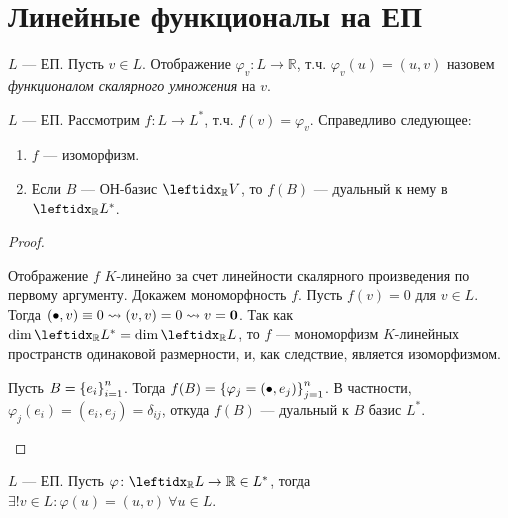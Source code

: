 \section{Линейные функционалы на ЕП}

\begin{defn}
    $L$ --- ЕП. Пусть $v \in L$. Отображение $\varphi_v \colon L \to \mathbb{R}$, т.ч. $\varphi_v(u) = (u, v)$ назовем \textit{функционалом скалярного умножения} на $v$.
\end{defn}

\begin{thm*}
    $L$ --- ЕП. Рассмотрим $f \colon L \to L^*$, т.ч. $f(v) = \varphi_v$. Справедливо следующее:
    \begin{enumerate}
        \item $f$ --- изоморфизм.
        \item Если $B$ --- ОН-базис $\lsub{\mathbb{R}}{V}$, то $f(B)$ --- дуальный к нему в $\lsub{\mathbb{R}}{L^*}$.
    \end{enumerate}
\end{thm*}

\begin{proof}
    \begin{proofpart}
        Отображение $f$ $K$-линейно за счет линейности скалярного произведения по первому аргументу. Докажем мономорфность $f$. Пусть $f(v) = 0$ для $v \in L$. Тогда $(\bullet, v) \equiv 0 \leadsto (v, v) = 0 \leadsto v = \mathbf{0}$. Так как $\dim \lsub{\mathbb{R}}{L^*} = \dim \lsub{\mathbb{R}}{L}$, то $f$ --- мономорфизм $K$-линейных пространств одинаковой размерности, и, как следствие, является изоморфизмом.
    \end{proofpart}
    \begin{proofpart}
        Пусть $B = \left\{e_i\right\}_{i=1}^{n}$. Тогда $f(B) = \left\{\varphi_j = (\bullet, e_j)\right\}_{j=1}^{n}$. В частности, $\varphi_j(e_i) = (e_i, e_j) = \delta_{ij}$, откуда $f(B)$ --- дуальный к $B$ базис $L^*$.
    \end{proofpart}
\end{proof}

\begin{cor*}
    $L$ --- ЕП. Пусть $\varphi \colon \lsub{\mathbb{R}}{L} \to \mathbb{R} \in L^*$, тогда $\exists! v \in L \colon \varphi(u) = (u, v)\ \forall u \in L$.
\end{cor*}